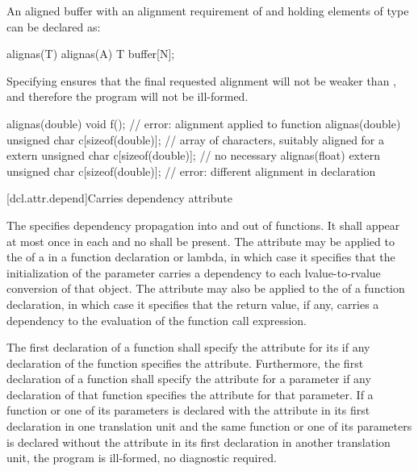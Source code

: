 \pnum
\begin{example}
An aligned buffer with an alignment requirement
of  and holding  elements of type 
can be declared as:
\begin{codeblock}
alignas(T) alignas(A) T buffer[N];
\end{codeblock}
Specifying  ensures
that the final requested alignment will not be weaker than ,
and therefore the program will not be ill-formed.
\end{example}

\pnum
\begin{example}
\begin{codeblock}
alignas(double) void f();                           // error: alignment applied to function
alignas(double) unsigned char c[sizeof(double)];    // array of characters, suitably aligned for a 
extern unsigned char c[sizeof(double)];             // no  necessary
alignas(float)
  extern unsigned char c[sizeof(double)];           // error: different alignment in declaration
\end{codeblock}
\end{example}

[dcl.attr.depend]{Carries dependency attribute}%

\pnum
The   specifies
dependency propagation into and out of functions. It shall appear at most once
in each  and no
 shall be present. The attribute may be
applied to the  of a
 in a function declaration or lambda, in
which case it specifies that the initialization of the parameter carries a
dependency to each lvalue-to-rvalue
conversion of that object. The attribute may also be applied
to the  of a function declaration, in which case it
specifies that the return value, if any, carries a dependency to the evaluation
of the function call expression.

\pnum
The first declaration of a function shall specify the  attribute for its
 if any declaration of the function specifies the
 attribute. Furthermore, the first declaration of a function shall specify
the  attribute for a parameter if any declaration of that function
specifies the  attribute for that parameter. If a function or one of its
parameters is declared with the  attribute in its first declaration in one
translation unit and the same function or one of its parameters is declared without the
 attribute in its first declaration in another translation unit, the
program is ill-formed, no diagnostic required.

